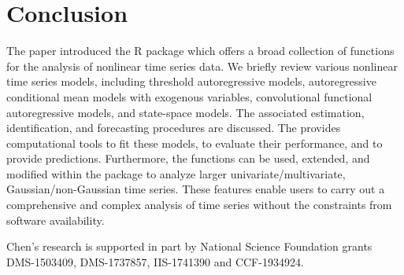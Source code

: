 \section{Conclusion}
The paper introduced the {R} package  which offers a broad collection of functions for the analysis of nonlinear time series data. We briefly review various nonlinear time series models, including threshold autoregressive models, autoregressive conditional mean models with exogenous variables, convolutional functional autoregressive models, and state-space models. The associated estimation, identification, and forecasting procedures are discussed. The  provides computational tools to fit these models, to evaluate their performance, and to provide predictions. Furthermore, the functions can be used, extended, and modified within the package to analyze larger univariate/multivariate, Gaussian/non-Gaussian time series. These features enable users to carry out a comprehensive and complex analysis of time series without the constraints from software availability.









\address{Xialu Liu\\
  Department of Management Information Systems\\
  San Diego State University\\
  5500 Campanile Drive, San Diego, CA 92182\\
  USA\\
  }

\address{Rong Chen\\
  Department of Statistics\\
  Rutgers University\\
  57 US Highway 1, New Brunswick, NJ 08901\\
  USA\\
  }

\address{Ruey Tsay\\
  Booth School of Business\\
  University of Chicago\\
  5801 E Ellis Ave, Chicago, IL 60637\\
  USA\\
  }
  
\noindent Chen's research is supported in part by
National Science Foundation grants DMS-1503409, DMS-1737857, IIS-1741390 and CCF-1934924.
